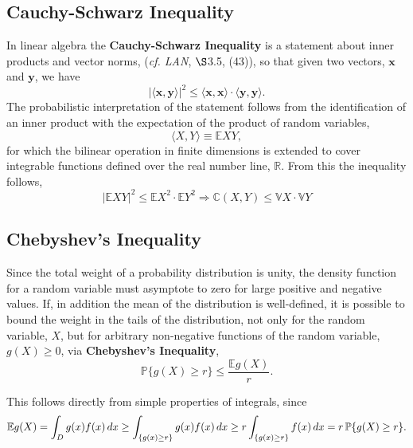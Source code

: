 \documentclass[12pt, twoside, draft]{article}
\begin{document}
\subsection{Cauchy-Schwarz Inequality}\label{sec:Cauchy-Schwarz_inequality}
In linear algebra the \textbf{Cauchy-Schwarz Inequality} is a statement about inner products and vector norms, (\textit{cf. LAN}, $\S$3.5, (43)), so that given two vectors, $\mathbf{x}$ and $\mathbf{y}$, we have
\begin{equation}
|\langle \mathbf{x}, \mathbf{y} \rangle |^2 \leq \langle \mathbf{x}, \mathbf{x} \rangle \cdot \langle \mathbf{y}, \mathbf{y} \rangle.
\end{equation}
The probabilistic interpretation of the statement follows from the identification of an inner product with the expectation of the product of random variables,
\begin{equation}
\langle X,Y \rangle \equiv \mathbb{E}XY,
\end{equation}
for which the bilinear operation in finite dimensions is extended to cover integrable functions defined over the real number line, $\mathbb{R}$.  From this the inequality follows,
\begin{equation}
|\mathbb{E}XY|^2 \leq \mathbb{E}X^2 \cdot \mathbb{E}Y^2 \Rightarrow \mathbb{C}(X, Y) \leq \mathbb{V}X \cdot \mathbb{V}Y
\end{equation}

\subsection{Chebyshev's Inequality}\label{sec:Chebyshevs_inequality}
Since the total weight of a probability distribution is unity, the density function for a random variable must asymptote to zero for large positive and negative values.  If, in addition the mean of the distribution is well-defined, it is possible to bound the weight in the tails of the distribution, not only for the random variable, $X$, but for arbitrary non-negative functions of the random variable, $g(X) \geq 0$, via \textbf{Chebyshev's Inequality},
\begin{equation}
\mathbb{P}\{g(X) \geq r\} \leq \frac{\mathbb{E}g(X)}{r}.
\end{equation}

This follows directly from simple properties of integrals, since
\begin{equation}
\mathbb{E}g(X) = \int_D g(x)f(x) \,dx \geq \int_{\{g(x) \geq r\}} g(x)f(x)\,dx \\ \geq r \int_{\{g(x) \geq r\}} f(x)\, dx = r \, \mathbb{P} \{g(X) \geq r\}.
\end{equation}
\end{document}
